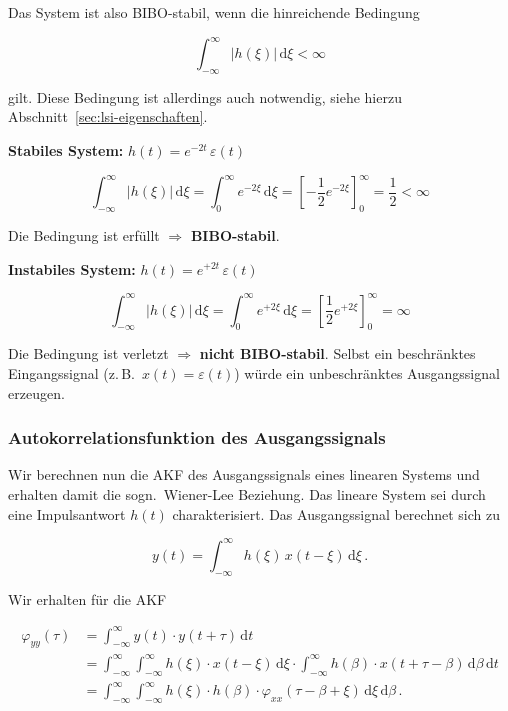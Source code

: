 Das System ist also BIBO-stabil, wenn die hinreichende Bedingung

$$
\int_{-\infty}^{\infty} |h(\xi)|\,\mathrm{d}\xi < \infty
$$

gilt. Diese Bedingung ist allerdings auch notwendig, siehe hierzu Abschnitt~\ref{sec:lsi-eigenschaften}.

\begin{beispiel}
\textbf{Stabiles System:} $h(t) = e^{-2t}\,\varepsilon(t)$

$$
\int_{-\infty}^{\infty} |h(\xi)|\,\mathrm{d}\xi
= \int_0^{\infty} e^{-2\xi}\,\mathrm{d}\xi
= \left[-\frac{1}{2}e^{-2\xi}\right]_0^{\infty}
= \frac{1}{2} < \infty
$$

Die Bedingung ist erfüllt $\Rightarrow$ \textbf{BIBO-stabil}.

\textbf{Instabiles System:} $h(t) = e^{+2t}\,\varepsilon(t)$

$$
\int_{-\infty}^{\infty} |h(\xi)|\,\mathrm{d}\xi
= \int_0^{\infty} e^{+2\xi}\,\mathrm{d}\xi
= \left[\frac{1}{2}e^{+2\xi}\right]_0^{\infty}
= \infty
$$

Die Bedingung ist verletzt $\Rightarrow$ \textbf{nicht BIBO-stabil}. Selbst ein beschränktes Eingangssignal (z.\,B.\ $x(t) = \varepsilon(t)$) würde ein unbeschränktes Ausgangssignal erzeugen.
\end{beispiel}

\subsubsection*{Autokorrelationsfunktion des Ausgangssignals}

Wir berechnen nun die AKF des Ausgangssignals eines linearen Systems und erhalten damit die sogn.\ Wiener-Lee Beziehung. Das lineare System sei durch eine Impulsantwort $h(t)$ charakterisiert. Das Ausgangssignal berechnet sich zu

$$
y(t) = \int_{-\infty}^{\infty} h(\xi)\,x(t - \xi)\,\mathrm{d}\xi\,.
$$

Wir erhalten für die AKF

\begin{align*}
\varphi_{yy}(\tau) &= \int_{-\infty}^{\infty} y(t)\cdot y(t + \tau)\,\mathrm{d}t \\
&= \int_{-\infty}^{\infty}\int_{-\infty}^{\infty} h(\xi)\cdot x(t - \xi)\,\mathrm{d}\xi \cdot \int_{-\infty}^{\infty} h(\beta)\cdot x(t + \tau - \beta)\,\mathrm{d}\beta\,\mathrm{d}t \\
&= \int_{-\infty}^{\infty}\int_{-\infty}^{\infty} h(\xi)\cdot h(\beta)\cdot \varphi_{xx}(\tau - \beta + \xi)\,\mathrm{d}\xi\,\mathrm{d}\beta\,.
\end{align*}

